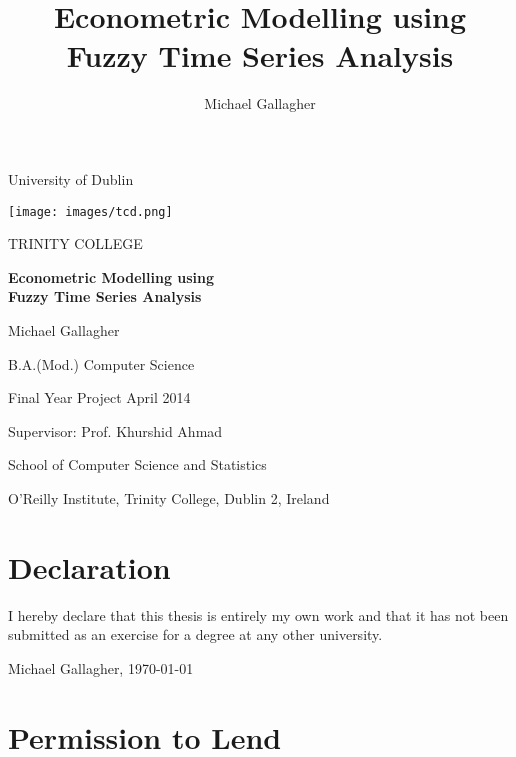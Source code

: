 \documentclass[12pt, oneside, a4paper]{article}
\title{Econometric Modelling using \\Fuzzy Time Series Analysis}
\author{Michael Gallagher}
\date{}
\theoremstyle{definition}
\begin{document}
\thispagestyle{empty}
\centerline{\huge{University of Dublin}} 

\vspace{5mm}

\centerline{
\texttt{[image: images/tcd.png]}
}

\vspace{5mm}

\centerline{\LARGE{TRINITY COLLEGE}} 

\vspace{10mm}

\begin{center}
\textbf{\LARGE{Econometric Modelling using \\Fuzzy Time Series Analysis}}
\end{center}

\vspace{10 mm}

\centerline{Michael Gallagher}
\centerline{B.A.(Mod.) Computer Science}
\centerline{Final Year Project  April 2014}
\centerline{Supervisor: Prof. Khurshid Ahmad}

\vspace{10 mm}

\vspace{30 mm}

\centerline{School of Computer Science and Statistics}

\vspace{3 mm}

\centerline{O'Reilly Institute, Trinity College, Dublin 2, Ireland}

\vspace{10 mm}

\clearpage

\section*{Declaration}

\thispagestyle{empty}
I hereby declare that this thesis is entirely my own work and that it
has not been submitted as an exercise for a degree at any other
university.

\begin{center}
\vspace*{2in}

Michael Gallagher, \today

\end{center}

\section*{Permission to Lend}
\thispagestyle{empty}
\end{document}

